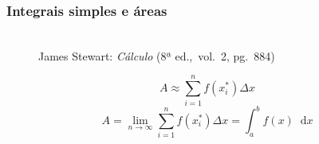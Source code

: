 \documentclass[pdftex, brazil, aspectratio=169]{beamer}
\newcommand*\diff{\mathop{}\!\mathrm{d}}
\begin{document}
\begin{frame}[t]
  \frametitle{Integrais simples e áreas}
  \begin{figure}[H]
    \begin{center}
      \label{fig:int1-01}
      \\
      \footnotesize{James Stewart: \emph{Cálculo} (8ª ed.,\ vol.\ 2, pg.\ 884)}
    \end{center}
  \end{figure}
  \begin{equation}
    A \approx \sum_{i=1}^n f(x_i^*) \Delta x
  \end{equation}
  \begin{equation}
    A  = \lim_{n \to \infty} \sum_{i=1}^n f(x_i^*) \Delta x = \int_a^b
    f(x) \diff x
  \end{equation}
\end{frame}
\end{document}
